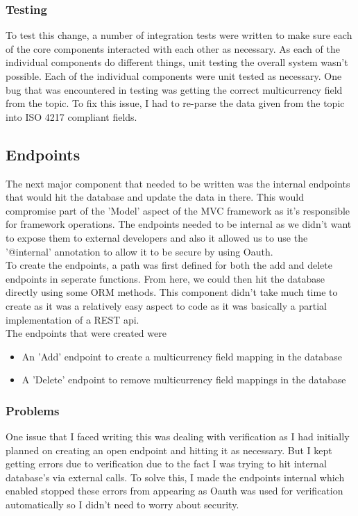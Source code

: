\subsubsection{Testing}
To test this change, a number of integration tests were written to make sure each of the core components interacted with each other as necessary. As each of the individual components do different things, unit testing the overall system wasn't possible. Each of the individual components were unit tested as necessary. One bug that was encountered in testing was getting the correct multicurrency field from the topic. To fix this issue, I had to re-parse the data given from the topic into ISO 4217 compliant fields.

\subsection{Endpoints}
The next major component that needed to be written was the internal endpoints that would hit the database and update the data in there. This would compromise part of the 'Model' aspect of the MVC framework as it's responsible for framework operations. The endpoints needed to be internal as we didn't want to expose them to external developers and also it allowed us to use the '@internal' annotation to allow it to be secure by using Oauth. \newline \\ To create the endpoints, a path was first defined for both the add and delete endpoints in seperate functions. From here, we could then hit the database directly using some ORM methods. This component didn't take much time to create as it was a relatively easy aspect to code as it was basically a partial implementation of a REST api. \newline \\ The endpoints that were created were  \begin{itemize}
\item An 'Add' endpoint to create a multicurrency field mapping in the database
\item A 'Delete' endpoint to remove multicurrency field mappings in the database
\end{itemize}

\subsubsection{Problems}
One issue that I faced writing this was dealing with verification as I had initially planned on creating an open endpoint and hitting it as necessary. But I kept getting errors due to verification due to the fact I was trying to hit internal database's via external calls. To solve this, I made the endpoints internal which enabled stopped these errors from appearing as Oauth was used for verification automatically so I didn't need to worry about security.


